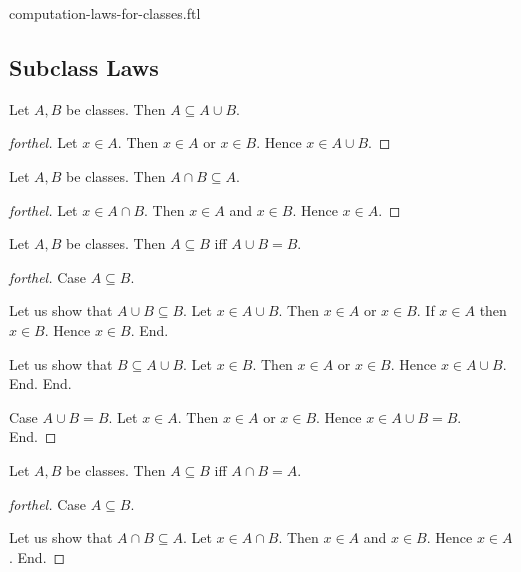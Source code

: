 \documentclass{naproche-library}
\begin{document}
\begin{smodule}{computation-laws-for-classes.ftl}
  \subsection*{Subclass Laws}

  \begin{proposition}[forthel,id=FOUNDATIONS_02_3793981508943872]
    Let $A, B$ be classes.
    Then $A \subseteq A \cup B$.
  \end{proposition}
  \begin{proof}[forthel]
    Let $x \in A$.
    Then $x \in A$ or $x \in B$.
    Hence $x \in A \cup B$.
  \end{proof}

  \begin{proposition}[forthel,id=FOUNDATIONS_02_1591517646946304]
    Let $A, B$ be classes.
    Then $A \cap B \subseteq A$.
  \end{proposition}
  \begin{proof}[forthel]
    Let $x \in A \cap B$.
    Then $x \in A$ and $x \in B$.
    Hence $x \in A$.
  \end{proof}

  \begin{proposition}[forthel,id=FOUNDATIONS_02_6657236858306560]
    Let $A, B$ be classes.
    Then $A \subseteq B$ iff $A \cup B = B$.
  \end{proposition}
  \begin{proof}[forthel]
    Case $A \subseteq B$.

      Let us show that $A \cup B \subseteq B$.
        Let $x \in A \cup B$.
        Then $x \in A$ or $x \in B$.
        If $x \in A$ then $x \in B$.
        Hence $x \in B$.
      End.

      Let us show that $B \subseteq A \cup B$.
        Let $x \in B$.
        Then $x \in A$ or $x \in B$.
        Hence $x \in A \cup B$.
      End.
    End.

    Case $A \cup B = B$.
      Let $x \in A$.
      Then $x \in A$ or $x \in B$.
      Hence $x \in A \cup B = B$.
    End.
  \end{proof}

  \begin{proposition}[forthel,id=FOUNDATIONS_02_2356449346846720]
    Let $A, B$ be classes.
    Then $A \subseteq B$ iff $A \cap B = A$.
  \end{proposition}
  \begin{proof}[forthel]
    Case $A \subseteq B$.

      Let us show that $A \cap B \subseteq A$.
        Let $x \in A \cap B$.
        Then $x \in A$ and $x \in B$.
        Hence $x \in A$.
      End.


\end{proof}
\end{smodule}
\end{document}
